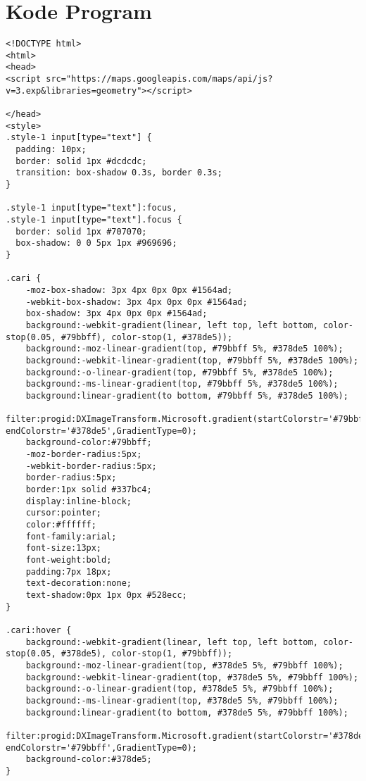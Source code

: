 \chapter{Kode Program}
\label{kode_program}

\singlespacing 
%
%
\lstset{basicstyle=\tiny}
\begin{lstlisting}[caption=aplikasi.html]
<!DOCTYPE html>
<html>
<head>
<script src="https://maps.googleapis.com/maps/api/js?v=3.exp&libraries=geometry"></script>

</head>
<style>
.style-1 input[type="text"] {
  padding: 10px;
  border: solid 1px #dcdcdc;
  transition: box-shadow 0.3s, border 0.3s;
}

.style-1 input[type="text"]:focus,
.style-1 input[type="text"].focus {
  border: solid 1px #707070;
  box-shadow: 0 0 5px 1px #969696;
}

.cari {
	-moz-box-shadow: 3px 4px 0px 0px #1564ad;
	-webkit-box-shadow: 3px 4px 0px 0px #1564ad;
	box-shadow: 3px 4px 0px 0px #1564ad;
	background:-webkit-gradient(linear, left top, left bottom, color-stop(0.05, #79bbff), color-stop(1, #378de5));
	background:-moz-linear-gradient(top, #79bbff 5%, #378de5 100%);
	background:-webkit-linear-gradient(top, #79bbff 5%, #378de5 100%);
	background:-o-linear-gradient(top, #79bbff 5%, #378de5 100%);
	background:-ms-linear-gradient(top, #79bbff 5%, #378de5 100%);
	background:linear-gradient(to bottom, #79bbff 5%, #378de5 100%);
	filter:progid:DXImageTransform.Microsoft.gradient(startColorstr='#79bbff', endColorstr='#378de5',GradientType=0);
	background-color:#79bbff;
	-moz-border-radius:5px;
	-webkit-border-radius:5px;
	border-radius:5px;
	border:1px solid #337bc4;
	display:inline-block;
	cursor:pointer;
	color:#ffffff;
	font-family:arial;
	font-size:13px;
	font-weight:bold;
	padding:7px 18px;
	text-decoration:none;
	text-shadow:0px 1px 0px #528ecc;
}

.cari:hover {
	background:-webkit-gradient(linear, left top, left bottom, color-stop(0.05, #378de5), color-stop(1, #79bbff));
	background:-moz-linear-gradient(top, #378de5 5%, #79bbff 100%);
	background:-webkit-linear-gradient(top, #378de5 5%, #79bbff 100%);
	background:-o-linear-gradient(top, #378de5 5%, #79bbff 100%);
	background:-ms-linear-gradient(top, #378de5 5%, #79bbff 100%);
	background:linear-gradient(to bottom, #378de5 5%, #79bbff 100%);
	filter:progid:DXImageTransform.Microsoft.gradient(startColorstr='#378de5', endColorstr='#79bbff',GradientType=0);
	background-color:#378de5;
}


\end{lstlisting}
